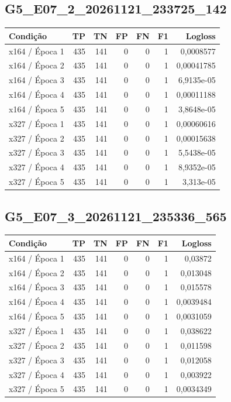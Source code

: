 \subsection{G5\_E07\_2\_20261121\_233725\_142}
\small\begin{longtable}{@{}p{.38\linewidth}rrrrrr@{}}
\toprule Condição & TP & TN & FP & FN & F1 & Logloss\\\midrule\endhead
x164 /\allowbreak{} Época 1 & 435 & 141 & 0 & 0 & 1 & 0,0008577\\
x164 /\allowbreak{} Época 2 & 435 & 141 & 0 & 0 & 1 & 0,00041785\\
x164 /\allowbreak{} Época 3 & 435 & 141 & 0 & 0 & 1 & 6,9135e-05\\
x164 /\allowbreak{} Época 4 & 435 & 141 & 0 & 0 & 1 & 0,00011188\\
x164 /\allowbreak{} Época 5 & 435 & 141 & 0 & 0 & 1 & 3,8648e-05\\
x327 /\allowbreak{} Época 1 & 435 & 141 & 0 & 0 & 1 & 0,00060616\\
x327 /\allowbreak{} Época 2 & 435 & 141 & 0 & 0 & 1 & 0,00015638\\
x327 /\allowbreak{} Época 3 & 435 & 141 & 0 & 0 & 1 & 5,5438e-05\\
x327 /\allowbreak{} Época 4 & 435 & 141 & 0 & 0 & 1 & 8,9352e-05\\
x327 /\allowbreak{} Época 5 & 435 & 141 & 0 & 0 & 1 & 3,313e-05\\
\bottomrule\end{longtable}\normalsize

\subsection{G5\_E07\_3\_20261121\_235336\_565}
\small\begin{longtable}{@{}p{.38\linewidth}rrrrrr@{}}
\toprule Condição & TP & TN & FP & FN & F1 & Logloss\\\midrule\endhead
x164 /\allowbreak{} Época 1 & 435 & 141 & 0 & 0 & 1 & 0,03872\\
x164 /\allowbreak{} Época 2 & 435 & 141 & 0 & 0 & 1 & 0,013048\\
x164 /\allowbreak{} Época 3 & 435 & 141 & 0 & 0 & 1 & 0,015578\\
x164 /\allowbreak{} Época 4 & 435 & 141 & 0 & 0 & 1 & 0,0039484\\
x164 /\allowbreak{} Época 5 & 435 & 141 & 0 & 0 & 1 & 0,0031059\\
x327 /\allowbreak{} Época 1 & 435 & 141 & 0 & 0 & 1 & 0,038622\\
x327 /\allowbreak{} Época 2 & 435 & 141 & 0 & 0 & 1 & 0,011598\\
x327 /\allowbreak{} Época 3 & 435 & 141 & 0 & 0 & 1 & 0,012058\\
x327 /\allowbreak{} Época 4 & 435 & 141 & 0 & 0 & 1 & 0,003922\\
x327 /\allowbreak{} Época 5 & 435 & 141 & 0 & 0 & 1 & 0,0034349\\
\bottomrule\end{longtable}\normalsize

